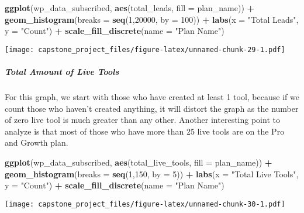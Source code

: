 \documentclass[]{article}
\newenvironment{Shaded}{\begin{snugshade}}{\end{snugshade}}
\newcommand{\KeywordTok}[1]{\textcolor[rgb]{0.13,0.29,0.53}{\textbf{#1}}}
\newcommand{\DataTypeTok}[1]{\textcolor[rgb]{0.13,0.29,0.53}{#1}}
\newcommand{\DecValTok}[1]{\textcolor[rgb]{0.00,0.00,0.81}{#1}}
\newcommand{\StringTok}[1]{\textcolor[rgb]{0.31,0.60,0.02}{#1}}
\newcommand{\OperatorTok}[1]{\textcolor[rgb]{0.81,0.36,0.00}{\textbf{#1}}}
\newcommand{\NormalTok}[1]{#1}
\let\oldsubparagraph\subparagraph
\renewcommand{\subparagraph}[1]{\oldsubparagraph{#1}\mbox{}}
\begin{document}
\begin{Shaded}
\begin{Highlighting}[]
\KeywordTok{ggplot}\NormalTok{(wp_data_subscribed, }\KeywordTok{aes}\NormalTok{(total_leads, }\DataTypeTok{fill =}\NormalTok{ plan_name)) }\OperatorTok{+}
\StringTok{  }\KeywordTok{geom_histogram}\NormalTok{(}\DataTypeTok{breaks =} \KeywordTok{seq}\NormalTok{(}\DecValTok{1}\NormalTok{,}\DecValTok{20000}\NormalTok{, }\DataTypeTok{by =} \DecValTok{100}\NormalTok{))  }\OperatorTok{+}
\StringTok{  }\KeywordTok{labs}\NormalTok{(}\DataTypeTok{x =} \StringTok{"Total Leads"}\NormalTok{, }\DataTypeTok{y =} \StringTok{"Count"}\NormalTok{) }\OperatorTok{+}
\StringTok{  }\KeywordTok{scale_fill_discrete}\NormalTok{(}\DataTypeTok{name =} \StringTok{"Plan Name"}\NormalTok{) }
\end{Highlighting}
\end{Shaded}

\texttt{[image: capstone\_project\_files/figure-latex/unnamed-chunk-29-1.pdf]}

\subparagraph{Total Amount of Live
Tools}\label{total-amount-of-live-tools}

For this graph, we start with those who have created at least 1 tool,
because if we count those who haven't created anything, it will distort
the graph as the number of zero live tool is much greater than any
other. Another interesting point to analyze is that most of those who
have more than 25 live tools are on the Pro and Growth plan.

\begin{Shaded}
\begin{Highlighting}[]
\KeywordTok{ggplot}\NormalTok{(wp_data_subscribed, }\KeywordTok{aes}\NormalTok{(total_live_tools, }\DataTypeTok{fill =}\NormalTok{ plan_name)) }\OperatorTok{+}
\StringTok{  }\KeywordTok{geom_histogram}\NormalTok{(}\DataTypeTok{breaks =} \KeywordTok{seq}\NormalTok{(}\DecValTok{1}\NormalTok{,}\DecValTok{150}\NormalTok{, }\DataTypeTok{by =} \DecValTok{5}\NormalTok{)) }\OperatorTok{+}
\StringTok{  }\KeywordTok{labs}\NormalTok{(}\DataTypeTok{x =} \StringTok{"Total Live Tools"}\NormalTok{, }\DataTypeTok{y =} \StringTok{"Count"}\NormalTok{) }\OperatorTok{+}
\StringTok{  }\KeywordTok{scale_fill_discrete}\NormalTok{(}\DataTypeTok{name =} \StringTok{"Plan Name"}\NormalTok{)  }
\end{Highlighting}
\end{Shaded}

\texttt{[image: capstone\_project\_files/figure-latex/unnamed-chunk-30-1.pdf]}
\end{document}
